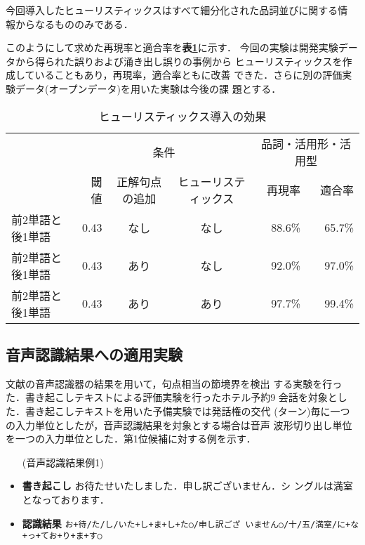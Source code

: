今回導入したヒューリスティックスはすべて細分化された品詞並びに関する情
報からなるもののみである．

このようにして求めた再現率と適合率を{\bf\dg 表\ref{t:result2}}に示す．
今回の実験は開発実験データから得られた誤りおよび涌き出し誤りの事例から
ヒューリスティックスを作成していることもあり，再現率，適合率ともに改善
できた．さらに別の評価実験データ(オープンデータ)を用いた実験は今後の課
題とする．

\begin{table}
\caption{ヒューリスティックス導入の効果}\label{t:result2}
\begin{center}
\begin{tabular}{|l||r|c|c||r|r|}
\hline
 & \multicolumn{3}{c||}{条件} & \multicolumn{2}{c|}{品詞・活用形・活用型} \\
\cline{2-6}
 & 閾値 & 正解句点の追加 & ヒューリスティックス & 再現率 & 適合率 \\
\hline\hline
前2単語と後1単語 & 0.43 & なし & なし & 88.6\% & 65.7\% \\
\hline
前2単語と後1単語 & 0.43 & あり & なし & 92.0\% & 97.0\% \\
\hline
前2単語と後1単語 & 0.43 & あり & あり & 97.7\% & 99.4\% \\
\hline
\end{tabular}
\end{center}
\end{table}

\subsection{音声認識結果への適用実験}

文献\cite{Shimizu96}の音声認識器の結果を用いて，句点相当の節境界を検出
する実験を行った．書き起こしテキストによる評価実験を行ったホテル予約9
会話を対象とした．書き起こしテキストを用いた予備実験では発話権の交代
(ターン)毎に一つの入力単位としたが，音声認識結果を対象とする場合は音声
波形切り出し単位を一つの入力単位とした．第1位候補に対する例を示す．

\begin{itemize}
\item[(音声認識結果例1)]
\item {\bf\dg 書き起こし} お待たせいたしました．申し訳ございません．シ
ングルは満室となっております．
\item {\bf\dg 認識結果} {\tt お+待/た/し/いた+し+ま+し+た○/申し訳ござ
いません○/十/五/満室/に+な+っ+てお+り+ま+す○}
\end{itemize}

